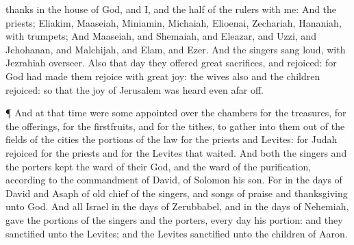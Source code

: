 {thanks in the
house of
God, and I, and the
half of the
rulers with me:
And the
priests;
Eliakim,
Maaseiah,
Miniamin,
Michaiah,
Elioenai,
Zechariah,
{}
Hananiah, with
trumpets;
And
Maaseiah, and
Shemaiah, and
Eleazar, and
Uzzi, and
Jehohanan, and
Malchijah, and
Elam, and
Ezer. And the
singers sang
loud, with
Jezrahiah
{}
overseer.
Also that
day they
offered
great
sacrifices, and
rejoiced: for
God had made them
rejoice with
great
joy: the
wives also and the
children
rejoiced: so that the
joy of
Jerusalem was
heard even afar
off.
\par }{\PP {}¶ And at that
time were
some
appointed over the
chambers for the
treasures, for the
offerings, for the
firstfruits, and for the
tithes, to
gather into them out of the
fields of the
cities the
portions of the
law for the
priests and
Levites: for
Judah
rejoiced for the
priests and for the
Levites that
waited.
And both the
singers and the
porters
kept the
ward of their
God, and the
ward of the
purification, according to the
commandment of
David,
{} of
Solomon his
son.
For in the
days of
David and
Asaph of
old
{}
chief of the
singers, and
songs of
praise and
thanksgiving unto
God.
And all
Israel in the
days of
Zerubbabel, and in the
days of
Nehemiah,
gave the
portions of the
singers and the
porters, every
day his
portion: and they
sanctified
{} unto the
Levites; and the
Levites
sanctified
{} unto the
children of
Aaron.

}
